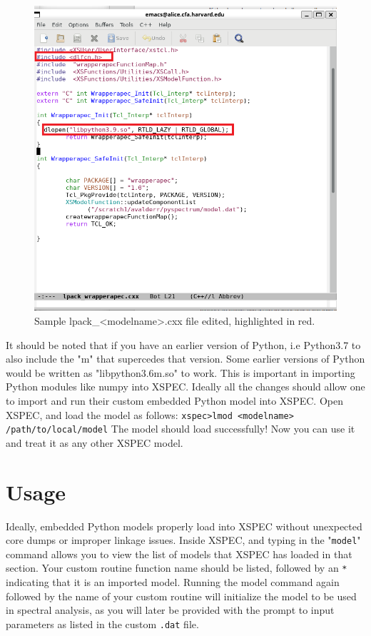 \documentclass[12pt]{article}
\begin{document}
\begin{figure}[H]
	\centering
	\includegraphics[width = 15cm] {lpack}
	\caption{Sample lpack\_<modelname>.cxx file edited, highlighted in red. }
\end{figure}
 It should be noted that if you have an earlier version of Python, i.e Python3.7 to also include the "m" that supercedes that version. Some earlier versions of Python would be written as "libpython3.6m.so" to work. This is important in importing Python modules like numpy into XSPEC. \newline
Ideally all the changes should allow one to import and run their custom embedded Python model into XSPEC. Open XSPEC, and load the model as follows: \newline
\indent\texttt{xspec>lmod <modelname> /path/to/local/model}\newline
The model should load successfully! Now you can use it and treat it as any other XSPEC model. 

\section{Usage}
Ideally, embedded Python models properly load into XSPEC without unexpected core dumps or improper linkage issues. Inside XSPEC, and typing in the "\texttt{model}" command allows you to view the list of models that XSPEC has loaded in that section. Your custom routine function name should be listed, followed by an \texttt{*} indicating that it is an imported model. Running the model command again followed by the name of your custom routine will initialize the model to be used in spectral analysis, as you will later be provided with the prompt to input parameters as listed in the custom \texttt{.dat} file. \newline
\end{document}
